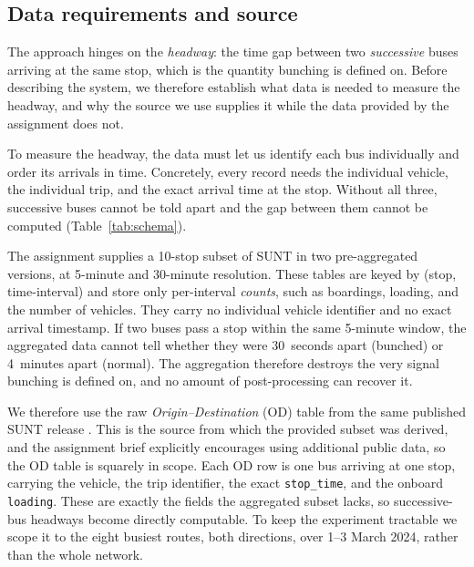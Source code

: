 \documentclass[final,5p,times,twocolumn,authoryear]{elsarticle}
\begin{document}
\subsection{Data requirements and source}
\label{sec:data}

The approach hinges on the \emph{headway}: the time gap between two \emph{successive} buses arriving
at the same stop, which is the quantity bunching is defined on. Before describing the system, we
therefore establish what data is needed to measure the headway, and why the source we use supplies it
while the data provided by the assignment does not.

To measure the headway, the data must let us identify each bus individually and order its
arrivals in time. Concretely, every record needs the individual vehicle, the individual trip, and
the exact arrival time at the stop. Without all three, successive buses cannot be told apart and
the gap between them cannot be computed (Table~\ref{tab:schema}).

The assignment supplies a 10-stop subset of SUNT in two pre-aggregated versions, at 5-minute and
30-minute resolution. These tables are keyed by (stop, time-interval) and store only per-interval
\emph{counts}, such as boardings, loading, and the number of vehicles. They carry no individual
vehicle identifier and no exact arrival timestamp. If two buses pass a stop within the same
5-minute window, the aggregated data cannot tell whether they were 30~seconds apart (bunched) or
4~minutes apart (normal). The aggregation therefore destroys the very signal bunching is defined
on, and no amount of post-processing can recover it.

We therefore use the raw \emph{Origin--Destination} (OD) table from the same published SUNT release
\citep{Ferreira2025}. This is the source from which the provided subset was derived, and the
assignment brief explicitly encourages using additional public data, so the OD table is squarely in
scope. Each OD row is one bus arriving at one stop, carrying the vehicle, the trip identifier, the
exact \texttt{stop\_time}, and the onboard \texttt{loading}. These are exactly the fields the
aggregated subset lacks, so successive-bus headways become directly computable. To keep the
experiment tractable we scope it to the eight busiest routes, both directions, over 1--3 March 2024,
rather than the whole network.
\end{document}

